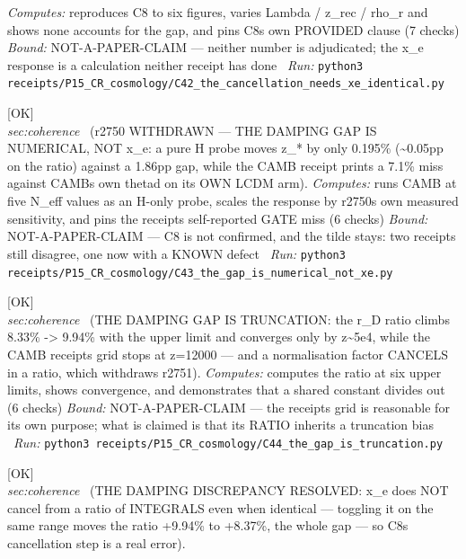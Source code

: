 \begin{description}
\emph{Computes:} reproduces C8 to six figures, varies Lambda / z\_rec / rho\_r and shows none accounts for the gap, and pins C8s own PROVIDED clause (7 checks)
 \emph{Bound:} NOT-A-PAPER-CLAIM --- neither number is adjudicated; the x\_e response is a calculation neither receipt has done
\ \emph{Run:} \texttt{python3 receipts/P15\_CR\_cosmology/C42\_the\_cancellation\_needs\_xe\_identical.py}
\item[\label{rcpt:C43_the_gap_is_numerical_not_xe}\texttt{C43\_the\_gap\_is\_numerical\_not\_xe}]\hfill\textsf{[OK]}\\
\textit{sec:coherence} \ (r2750 WITHDRAWN --- THE DAMPING GAP IS NUMERICAL, NOT x\_e: a pure H probe moves z\_* by only 0.195\% (\textasciitilde{}0.05pp on the ratio) against a 1.86pp gap, while the CAMB receipt prints a 7.1\% miss against CAMBs own thetad on its OWN LCDM arm). 
\emph{Computes:} runs CAMB at five N\_eff values as an H-only probe, scales the response by r2750s own measured sensitivity, and pins the receipts self-reported GATE miss (6 checks)
 \emph{Bound:} NOT-A-PAPER-CLAIM --- C8 is not confirmed, and the tilde stays: two receipts still disagree, one now with a KNOWN defect
\ \emph{Run:} \texttt{python3 receipts/P15\_CR\_cosmology/C43\_the\_gap\_is\_numerical\_not\_xe.py}
\item[\label{rcpt:C44_the_gap_is_truncation}\texttt{C44\_the\_gap\_is\_truncation}]\hfill\textsf{[OK]}\\
\textit{sec:coherence} \ (THE DAMPING GAP IS TRUNCATION: the r\_D ratio climbs 8.33\% -> 9.94\% with the upper limit and converges only by z\textasciitilde{}5e4, while the CAMB receipts grid stops at z=12000 --- and a normalisation factor CANCELS in a ratio, which withdraws r2751). 
\emph{Computes:} computes the ratio at six upper limits, shows convergence, and demonstrates that a shared constant divides out (6 checks)
 \emph{Bound:} NOT-A-PAPER-CLAIM --- the receipts grid is reasonable for its own purpose; what is claimed is that its RATIO inherits a truncation bias
\ \emph{Run:} \texttt{python3 receipts/P15\_CR\_cosmology/C44\_the\_gap\_is\_truncation.py}
\item[\label{rcpt:C45_xe_does_not_cancel_from_a_ratio_of_integrals}\texttt{C45\_xe\_does\_not\_cancel\_from\_a\_ratio\_of\_integrals}]\hfill\textsf{[OK]}\\
\textit{sec:coherence} \ (THE DAMPING DISCREPANCY RESOLVED: x\_e does NOT cancel from a ratio of INTEGRALS even when identical --- toggling it on the same range moves the ratio +9.94\% to +8.37\%, the whole gap --- so C8s cancellation step is a real error). 

\end{description}
